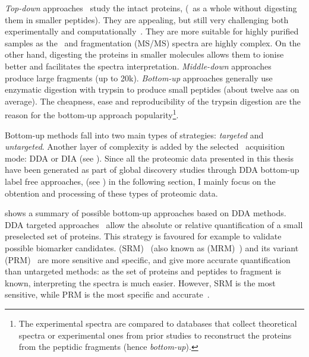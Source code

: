 \emph{Top-down} approaches~ study the intact proteins,
(\ie\ as a whole without digesting them in smaller peptides).
They are appealing, but still very challenging both
experimentally and computationally~.
They are more suitable for highly purified samples
as the \ms\ and fragmentation (\gls{MS/MS}) spectra are highly complex.
On the other hand,
digesting the proteins in smaller molecules allows them
to ionise better and facilitates the spectra interpretation.
\emph{Middle-down} approaches~ produce
large fragments (up to 20k).
\emph{Bottom-up} approaches generally use enzymatic digestion with trypsin
to produce small peptides (about twelve \glspl{aa} on average).
The cheapness, ease and reproducibility of the trypsin digestion
are the reason for the bottom-up approach popularity\footnote{%
The experimental spectra are compared to databases
that collect theoretical spectra or experimental ones from prior studies
to reconstruct the proteins from the peptidic fragments (hence \emph{bottom-up}).%
}.\mybr\

Bottom-up methods fall into two main types of strategies:
\emph{targeted} and \emph{untargeted}.
Another layer of complexity is added by the selected \ms\ acquisition mode:
\gls{DDA} or \gls{DIA} (see ).
Since all the proteomic data presented in this thesis
have been generated as part of global discovery studies
through \gls{DDA} bottom-up label free approaches,
(see )
in the following section,
I mainly focus on the obtention and processing of these types of proteomic data.\mybr\

 shows a summary of possible bottom-up approaches
based on \gls{DDA} methods.
\gls{DDA} targeted approaches~ allow
the absolute or relative quantification of a small preselected set of proteins.
This strategy is favoured for example to validate possible biomarker candidates.
 (\gls{SRM})~
(also known as  (\gls{MRM})~)
and its variant  (\gls{PRM})~
are more sensitive and specific, and give more accurate quantification
than untargeted methods:
as the set of proteins and peptides to fragment is known,
interpreting the spectra is much easier.
However, \gls{SRM} is the most sensitive,
while \gls{PRM} is the most specific and accurate~.\mybr\

